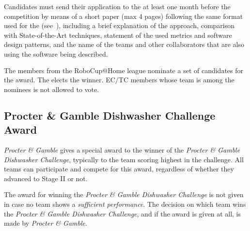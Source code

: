 Candidates must send their application to the  at least one month before the competition by means of a short paper (max 4 pages) following the same format used for the  (see~), including a brief explanation of the approach, comparison with State-of-the-Art techniques, statement of the used metrics and software design patterns, and the name of the teams and other collaborators that are also using the software being described.

The  members from the RoboCup@Home league 
nominate a set of candidates for the award. The  elects the winner. EC/TC members whose team is among the 
nominees is not allowed to vote.


\subsection{Procter \& Gamble Dishwasher Challenge Award}
\label{award:skill}
\textit{Procter \& Gamble} gives a special award to the winner of the 
\textit{Procter \& Gamble Dishwasher Challenge}, typically to the team scoring 
highest in the challenge.
All teams can participate and compete for this award, regardless of whether 
they advanced to Stage II or not.

The award for winning the \textit{Procter \& Gamble Dishwasher Challenge} is 
not given in case no team shows a \emph{sufficient performance}. The decision 
on which team wins the \textit{Procter \& Gamble Dishwasher Challenge}, and if 
the award is given at all, is made by \textit{Procter \& Gamble}.
